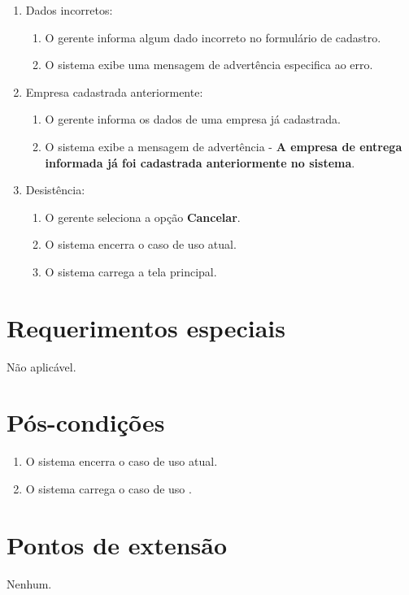 \begin{enumerate}
	\item Dados incorretos:
	\begin{enumerate}
		\item O gerente informa algum dado incorreto no formulário de cadastro. 
		\item O sistema exibe uma mensagem de advertência especifica ao erro.
	\end{enumerate}	
	\item Empresa cadastrada anteriormente:
	\begin{enumerate}
		\item O gerente informa os dados de uma empresa já cadastrada. 
		\item O sistema exibe a mensagem de advertência - \textbf{A empresa de entrega informada já foi cadastrada anteriormente no sistema}.
	\end{enumerate}	
	\item Desistência:
	\begin{enumerate}
		\item O gerente seleciona a opção \textbf{Cancelar}.
		\item O sistema encerra o caso de uso atual.
		\item O sistema carrega a tela principal.
	\end{enumerate}
\end{enumerate}

\section{Requerimentos especiais}

Não aplicável.

\section{Pós-condições}

\begin{enumerate}
	\item O sistema encerra o caso de uso atual.
	\item O sistema carrega o caso de uso .
\end{enumerate}

\section{Pontos de extensão}

Nenhum.